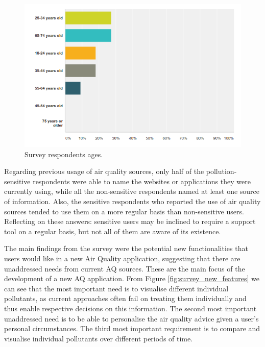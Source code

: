 \begin{figure}[H]
\begin{adjustbox}{width=1\textwidth,center=\textwidth}
  \centering
  \includegraphics[scale=1]{images/ages_survey.png}
\end{adjustbox}
  \caption[Survey respondents ages ]{Survey respondents ages.}
  \label{fig:survey_ages}
\end{figure}

Regarding previous usage of air quality sources, only half of the pollution-sensitive respondents were able to name the websites or applications they were currently using, while all the non-sensitive respondents named at least one source of information. Also, the sensitive respondents who reported the use of air quality sources tended to use them on a more regular basis than non-sensitive users. Reflecting on these answers: sensitive users may be inclined to require a support tool on a regular basis, but not all of them are aware of its existence.

The main findings from the survey were the potential new functionalities that users would like in a new Air Quality application, suggesting that there are unaddressed needs from current AQ sources. These are the main focus of the development of a new AQ application. From Figure \ref{fig:survey_new_features} we can see that the most important need is to visualise different individual pollutants, as current approaches often fail on treating them individually and thus enable respective decisions on this information. The second most important unaddressed need is to be able to personalise the air quality advice given a user's personal circumstances. The third most important requirement is to compare and visualise individual pollutants over different periods of time. 

